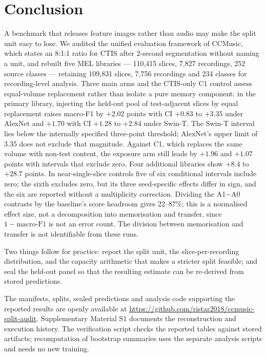 \section{Conclusion}\label{sec:conclusion}

A benchmark that releases feature images rather than audio may make the split unit easy to lose. We
audited the unified evaluation framework of CCMusic, which states an 8:1:1 ratio for CTIS after
2-second segmentation without naming a unit, and rebuilt five MEL libraries --- 110{,}415 slices, 7{,}827
recordings, 252 source classes --- retaining 109{,}831 slices, 7{,}756 recordings and 234 classes
for recording-level analysis. Three main arms and the CTIS-only C1 control assess equal-volume
replacement rather than isolate a pure memory component: in the primary library, injecting the
held-out pool of test-adjacent slices by equal replacement raises macro-F1 by $+2.02$ points
with CI $+0.83$ to $+3.35$ under AlexNet and $+1.70$ with CI $+1.28$ to $+2.84$ under
Swin-T. The Swin-T interval lies below the internally specified three-point threshold;
AlexNet's upper limit of 3.35 does not exclude that magnitude. Against C1, which replaces the same
volume with non-test content, the exposure arm still leads by $+1.96$ and $+1.07$ points with
intervals that exclude zero. Four additional libraries show
$+8.4$ to $+28.7$ points. In near-single-slice controls five of six conditional intervals include
zero; the sixth excludes zero, but its three seed-specific effects differ in sign, and the six are
reported without a multiplicity correction. Dividing the A1$-$A0 contrasts by the baseline's score
headroom gives 22--87\%; this is a normalised effect size, not a decomposition into
memorisation and transfer, since $1-\text{macro-F1}$ is not an error count.
The division between memorisation and transfer is not identifiable from these runs.

Two things follow for practice: report the split unit, the slice-per-recording distribution, and
the capacity arithmetic that makes a stricter split feasible; and seal the held-out panel so that
the resulting estimate can be re-derived from stored predictions.

The manifests, splits, sealed predictions and analysis code supporting the reported results are
openly available at \url{https://github.com/ristar2018/ccmusic-split-audit}. Supplementary
Material S1 documents the reconstruction and execution history. The verification script checks
the reported tables against stored artifacts; recomputation of bootstrap summaries uses the
separate analysis scripts and needs no new training.

